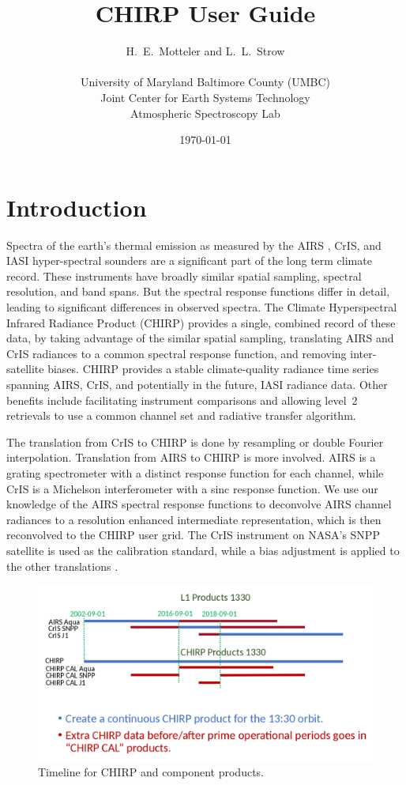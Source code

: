\documentclass[11pt]{article}
\title{
  CHIRP User Guide \\
}
\author{H.~E.~Motteler and L.~L.~Strow \\
  \\
  University of Maryland Baltimore County (UMBC)\\
  Joint Center for Earth Systems Technology \\
  Atmospheric Spectroscopy Lab \\
}
\date{\today}
\begin{document}
\maketitle

\tableofcontents

\section{Introduction}
\label{intro}

Spectra of the earth's thermal emission as measured by the AIRS
\cite{airs1}, CrIS\cite{cris1,cris2}, and IASI \cite{iasi1}
hyper-spectral sounders are a significant part of the long term
climate record.  These instruments have broadly similar spatial
sampling, spectral resolution, and band spans.  But the spectral
response functions differ in detail, leading to significant
differences in observed spectra.
The Climate Hyperspectral Infrared Radiance Product (CHIRP) provides
a single, combined record of these data, by taking advantage of the
similar spatial sampling, translating AIRS and CrIS radiances to a
common spectral response function, and removing inter-satellite
biases.  CHIRP provides a stable climate-quality radiance time
series spanning AIRS, CrIS, and potentially in the future, IASI
radiance data.  Other benefits include facilitating instrument
comparisons and allowing level~2 retrievals to use a common channel
set and radiative transfer algorithm.

The translation from CrIS to CHIRP is done by resampling or double
Fourier interpolation.  Translation from AIRS to CHIRP is more
involved.  AIRS is a grating spectrometer with a distinct response
function for each channel, while CrIS is a Michelson interferometer
with a sinc response function.  We use our knowledge of the AIRS
spectral response functions to deconvolve AIRS channel radiances to
a resolution enhanced intermediate representation, which is then
reconvolved to the CHIRP user grid.  The CrIS instrument on NASA's
SNPP satellite is used as the calibration standard, while a bias
adjustment is applied to the other translations \cite{strow2021a}.

\begin{figure}
  \centering
  \includegraphics[width=\textwidth]{figures/chirp_timeline.png}
  \caption{Timeline for CHIRP and component products.}
  \label{fig0}
\end{figure}
\end{document}

